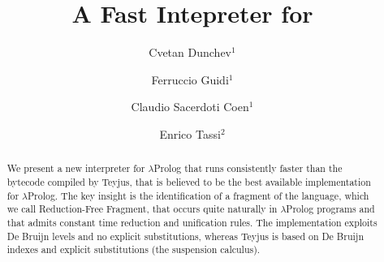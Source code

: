 \documentclass{llncs}
\begin{document}
\title{A Fast Intepreter for \lp}





\author{Cvetan Dunchev$^1$ \and
        Ferruccio Guidi$^1$ \and
        Claudio Sacerdoti Coen$^1$ \and
        Enrico Tassi$^2$}






\newcommand{\frag}{Reduction-Free Fragment}
\newcommand{\lp}{$\lambda$Prolog}
\newcommand{\elpi}{ELPI}
\newcommand{\CSC}[1]{\textcolor{red}{#1}}
\newcommand{\FG}[1]{\textcolor{magenta}{#1}}

\maketitle

\begin{abstract}
We present a new interpreter for \lp{} that runs consistently faster than
the bytecode compiled by Teyjus, that is believed to be the best
available implementation for \lp. The key insight is the identification of a fragment of
the language, which we call \frag, that occurs quite naturally in \lp{}
programs and that admits constant time reduction and unification rules.
The implementation exploits De Bruijn levels and no explicit substitutions,
whereas Teyjus is based on De Bruijn indexes and explicit substitutions (the
suspension calculus).
\end{abstract}
\end{document}
